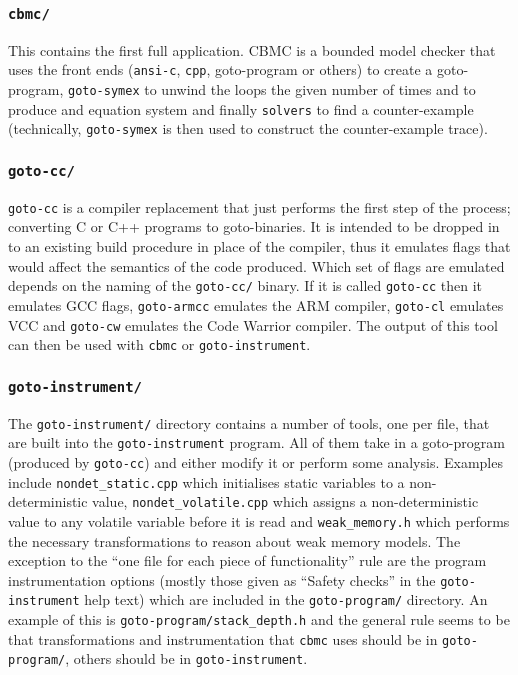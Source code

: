 \documentclass{article}
\newcommand{\dir}[1]{\texttt{#1}}
\newcommand{\file}[1]{\texttt{#1}}
\newcommand{\prog}[1]{\texttt{#1}}
\begin{document}
\subsubsection{\dir{cbmc/}}
\label{section:CBMC}

This contains the first full application.  CBMC is a bounded model
checker that uses the front ends (\dir{ansi-c}, \dir{cpp}, goto-program or others)
to create a goto-program, \dir{goto-symex} to unwind the loops the given
number of times and to produce and equation system and finally
\dir{solvers} to find a counter-example (technically, \dir{goto-symex}
is then used to construct the counter-example trace).



\subsubsection{\dir{goto-cc/}}
\label{section:goto-cc}

\dir{goto-cc} is a compiler replacement that just performs the first
step of the process; converting C or C++ programs to goto-binaries.
It is intended to be dropped in to an existing build procedure in
place of the compiler, thus it emulates flags that would affect the
semantics of the code produced.  Which set of flags are emulated
depends on the naming of the \dir{goto-cc/} binary.  If it is called
\prog{goto-cc} then it emulates GCC flags, \prog{goto-armcc} emulates
the ARM compiler, \prog{goto-cl} emulates VCC and \prog{goto-cw}
emulates the Code Warrior compiler.  The output of this tool can then
be used with \prog{cbmc} or \prog{goto-instrument}.




\subsubsection{\dir{goto-instrument/}}
\label{section:goto-instrument}

The \dir{goto-instrument/} directory contains a number of tools, one
per file, that are built into the \prog{goto-instrument} program.  All
of them take in a goto-program (produced by \prog{goto-cc}) and either
modify it or perform some analysis.  Examples include
\file{nondet\_static.cpp} which initialises static variables to a
non-deterministic value, \file{nondet\_volatile.cpp} which assigns
a non-deterministic value to any volatile variable before it is read
and \file{weak\_memory.h} which performs the necessary transformations
to reason about weak memory models.  The exception to the ``one file
for each piece of functionality'' rule are the program instrumentation
options (mostly those given as ``Safety checks'' in the
\prog{goto-instrument} help text) which are included in the
\prog{goto-program/} directory.  An example of this is
\file{goto-program/stack\_depth.h} and the general rule seems to be
that transformations and instrumentation that \prog{cbmc} uses should
be in \dir{goto-program/}, others should be in \dir{goto-instrument}.
\end{document}
